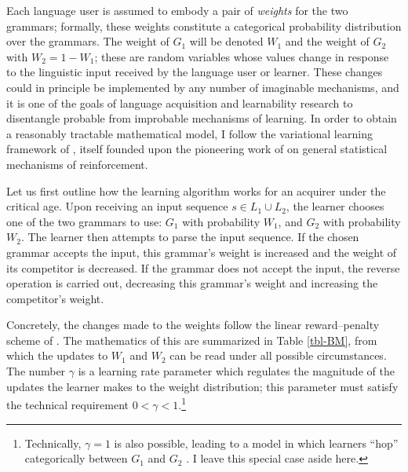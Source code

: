 Each language user is assumed to embody a pair of \emph{weights} for the
two grammars; formally, these weights constitute a categorical
probability distribution over the grammars. The weight of \(G_1\) will
be denoted \(W_1\) and the weight of \(G_2\) with \(W_2 = 1 - W_1\);
these are random variables whose values change in response to the
linguistic input received by the language user or learner. These changes
could in principle be implemented by any number of imaginable
mechanisms, and it is one of the goals of language acquisition and
learnability research to disentangle probable from improbable mechanisms
of learning. In order to obtain a reasonably tractable mathematical
model, I follow the variational learning framework of
\textcite{Yang2002}, itself founded upon the pioneering work of
\textcite{BushMosteller1955} on general statistical mechanisms of
reinforcement.

Let us first outline how the learning algorithm works for an acquirer
under the critical age. Upon receiving an input sequence
\(s \in L_1 \cup L_2\), the learner chooses one of the two grammars to
use: \(G_1\) with probability \(W_1\), and \(G_2\) with probability
\(W_2\). The learner then attempts to parse the input sequence. If the
chosen grammar accepts the input, this grammar's weight is increased and
the weight of its competitor is decreased. If the grammar does not
accept the input, the reverse operation is carried out, decreasing this
grammar's weight and increasing the competitor's weight.

Concretely, the changes made to the weights follow the linear
reward--penalty scheme of \textcite{BushMosteller1955}. The mathematics
of this are summarized in Table \ref{tbl-BM}, from which the updates to
\(W_1\) and \(W_2\) can be read under all possible circumstances. The
number \(\gamma\) is a learning rate parameter which regulates the
magnitude of the updates the learner makes to the weight distribution;
this parameter must satisfy the technical requirement
\(0 < \gamma < 1\).\footnote{Technically, \(\gamma = 1\) is also
  possible, leading to a model in which learners ``hop'' categorically
  between \(G_1\) and \(G_2\) \autocites[cf.][]{GibWex1994,NiyBer1996}.
  I leave this special case aside here.}

